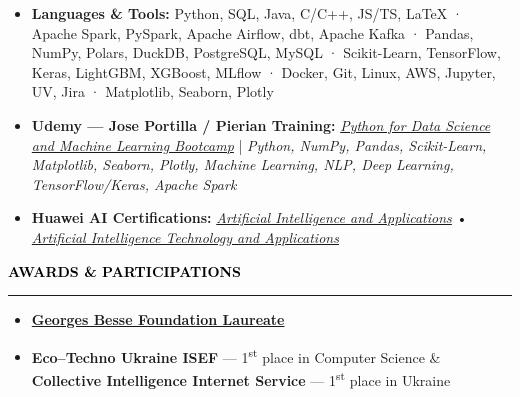 \documentclass[10pt,english,french]{article}
\newcommand{\awardIcon}[1][black]{\textcolor{#1}{\faTrophy}}
\newcommand{\cvsection}[1]{
    \vspace{4pt}
    \textbf{\fontsize{9pt}{10pt}\selectfont \textcolor{black}{#1}}
    \vspace{6pt}
    \hrule
    \vspace{6pt}
}
\begin{document}
\vspace{-4pt}
\begin{itemize}[leftmargin=0.5cm, label=\textbullet, itemsep=0.2em]
    \item \textbf{Languages \& Tools\!:}
          Python, SQL, Java, C/C++, JS/TS, LaTeX ·
          Apache Spark, PySpark, Apache Airflow, dbt, Apache Kafka ·
          Pandas, NumPy, Polars, DuckDB, PostgreSQL, MySQL ·
          Scikit-Learn, TensorFlow, Keras, LightGBM, XGBoost, MLflow ·
          Docker, Git, Linux, AWS, Jupyter, UV, Jira ·
          Matplotlib, Seaborn, Plotly

    \item \textbf{Udemy --- Jose Portilla / Pierian Training\!:}
          \href{https://www.udemy.com/certificate/UC-51319000-ccb8-4c9c-9320-6cd9860e601c/}
          {\textit{Python for Data Science and Machine Learning Bootcamp}}
          |
          \textit{Python, NumPy, Pandas, Scikit-Learn, Matplotlib, Seaborn, Plotly,
              Machine Learning, NLP, Deep Learning, TensorFlow/Keras, Apache Spark}

    \item \textbf{Huawei AI Certifications:}
          \href{https://github.com/DmytroPalahin/cv-latex-simple-en/blob/main/docs/huawei_artificial_intelligence_and_applications.pdf}
          {\textit{Artificial Intelligence and Applications}}
          \hspace{4pt}•\hspace{4pt}
          \href{https://github.com/DmytroPalahin/cv-latex-simple-en/blob/main/docs/huawei_artificial_intelligence_technology_and_applications.pdf}
          {\textit{Artificial Intelligence Technology and Applications}}

\end{itemize}

\vspace{-3pt}
\cvsection{\awardIcon[black]\hspace{4pt}AWARDS \& PARTICIPATIONS}

\vspace{-6pt}
\begin{itemize}[leftmargin=0.35cm, label=\textbullet, itemsep=0.15em]
    \item \textbf{\href{https://www.fondationbesse.com/}{Georges Besse Foundation Laureate}}
    \item \textbf{Eco\hspace{3pt}--\hspace{3pt}Techno Ukraine ISEF} --- 1\textsuperscript{st} place in Computer Science \& \textbf{Collective Intelligence Internet Service} --- 1\textsuperscript{st} place in Ukraine
\end{itemize}
\end{document}
